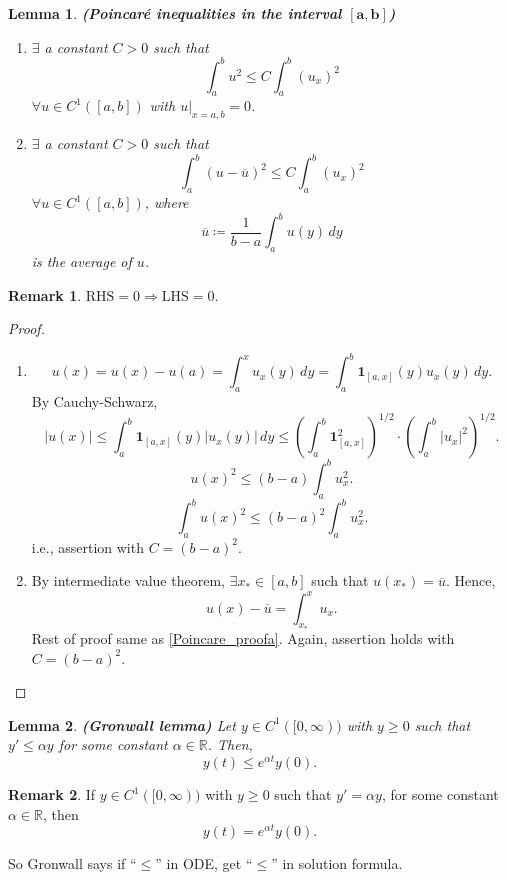 \documentclass[12pt]{article}
\newtheorem{lemma}{Lemma}[section]
\theoremstyle{definition}
\newtheorem*{remark}{Remark}
\begin{document}
\begin{lemma}
\emph{\textbf{(Poincar\'e inequalities in the interval $\boldsymbol{[a,b]}$)}}
\begin{enumerate}[label=\alph*)]
\item $\exists$ a constant $C>0$ such that
\[\int_a^bu^2\leq C\int_a^b(u_x)^2\]
$\forall u\in C^1([a,b])$ with $u|_{x=a,b}=0$.

\item $\exists$ a constant $C>0$ such that
\[\int_a^b(u-\overline u)^2\leq C\int_a^b(u_x)^2\]
$\forall u\in C^1([a,b])$, where
\[\overline u\coloneqq\frac1{b-a}\int_a^bu(y)\,dy\]
is the average of $u$.
\end{enumerate}
\end{lemma}

\begin{remark}
$\text{RHS}=0\Rightarrow\text{LHS}=0$.
\end{remark}

\begin{proof}
\begin{enumerate}[label=\alph*)]
\item\label{Poincare_proofa}
\[u(x)=u(x)-u(a)=\int_a^xu_x(y)\,dy=\int_a^b\boldsymbol1_{[a,x]}(y)u_x(y)\,dy.\]
By Cauchy-Schwarz,
\[|u(x)|\leq\int_a^b\boldsymbol1_{[a,x]}(y)|u_x(y)|\,dy\leq\left(\int_a^b\boldsymbol1_{[a,x]}^2\right)^{1/2}\cdot\left(\int_a^b|u_x|^2\right)^{1/2}.\]
\[u(x)^2\leq(b-a)\int_a^bu_x^2.\]
\[\int_a^bu(x)^2\leq(b-a)^2\int_a^bu_x^2.\]
i.e., assertion with $C=(b-a)^2$.

\item By intermediate value theorem, $\exists x_*\in[a,b]$ such that $u(x_*)=\overline u$. Hence,
\[u(x)-\overline u=\int_{x_*}^xu_x.\]
Rest of proof same as \ref{Poincare_proofa}. Again, assertion holds with $C=(b-a)^2$.
\end{enumerate}
\end{proof}

\begin{lemma}
\emph{\textbf{(Gronwall lemma)}} Let $y\in C^1([0,\infty))$ with $y\geq0$ such that $y'\leq\alpha y$ for some constant $\alpha\in\mathbb R$. Then,
\[y(t)\leq e^{\alpha t}y(0).\]
\end{lemma}

\begin{remark}
If $y\in C^1([0,\infty))$ with $y\geq0$ such that $y'=\alpha y$, for some constant $\alpha\in\mathbb R$, then
\[y(t)=e^{\alpha t}y(0).\]

So Gronwall says if ``$\leq$'' in ODE, get ``$\leq$'' in solution formula.
\end{remark}
\end{document}
